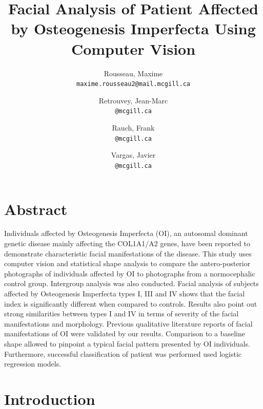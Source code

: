 \documentclass{article}
\title{Facial Analysis of Patient Affected by Osteogenesis
Imperfecta Using Computer Vision}
\author{
Rousseau, Maxime\\
\texttt{maxime.rousseau2@mail.mcgill.ca}
\and
Retrouvey, Jean-Marc\\
\texttt{@mcgill.ca}
\and
Rauch, Frank\\
\texttt{@mcgill.ca}
\and
Vargas, Javier\\
\texttt{@mcgill.ca}
}
\begin{document}
\maketitle
\begin{multicols}{2}
\section{Abstract}

Individuals affected by Osteogenesis Imperfecta (OI), an autosomal
dominant genetic disease mainly affecting the COL1A1/A2 genes, have been
reported to demonstrate characteristic facial manifestations of the
disease. This study uses computer vision and statistical shape analysis
to compare the antero-posterior photographs of individuals affected by
OI to photographs from a normocephalic control group. Intergroup
analysis was also conducted. Facial analysis of subjects affected by
Osteogenesis Imperfecta types I, III and IV shows that the facial index
is significantly different when compared to controls. Results also point
out strong similarities between types I and IV in terms of severity of
the facial manifestations and morphology. Previous qualitative
literature reports of facial manifestations of OI were validated by our
results. Comparison to a baseline shape allowed to pinpoint a typical
facial pattern presented by OI individuals. Furthermore, successful
classification of patient was performed used logistic regression models.

\section{Introduction}


\end{multicols}
\end{document}
